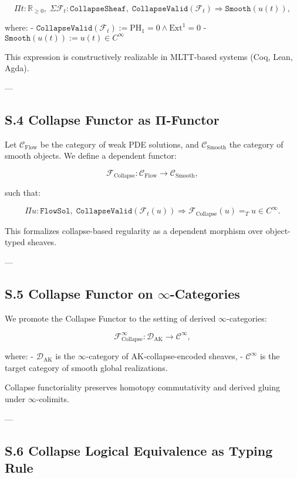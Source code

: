 \documentclass[11pt]{article}
\begin{document}
\[
\Pi t : \mathbb{R}_{\ge 0},\;
\Sigma \mathcal{F}_t : \texttt{CollapseSheaf},\;
\texttt{CollapseValid}(\mathcal{F}_t)
\Rightarrow \texttt{Smooth}(u(t)),
\]

where:
- $\texttt{CollapseValid}(\mathcal{F}_t) := \mathrm{PH}_1 = 0 \wedge \mathrm{Ext}^1 = 0$
- $\texttt{Smooth}(u(t)) := u(t) \in C^\infty$

This expression is constructively realizable in MLTT-based systems (Coq, Lean, Agda).

---

\subsection*{S.4 Collapse Functor as Π-Functor}

Let $\mathcal{C}_{\mathrm{Flow}}$ be the category of weak PDE solutions, and $\mathcal{C}_{\mathrm{Smooth}}$ the category of smooth objects.  
We define a dependent functor:

\[
\mathcal{F}_{\mathrm{Collapse}} : \mathcal{C}_{\mathrm{Flow}} \longrightarrow \mathcal{C}_{\mathrm{Smooth}},
\]

such that:

\[
\Pi u : \texttt{FlowSol},\;
\texttt{CollapseValid}(\mathcal{F}_t(u))
\Rightarrow \mathcal{F}_{\mathrm{Collapse}}(u) =_T u \in C^\infty.
\]

This formalizes collapse-based regularity as a dependent morphism over object-typed sheaves.

---

\subsection*{S.5 Collapse Functor on $\infty$-Categories}

We promote the Collapse Functor to the setting of derived $\infty$-categories:

\[
\mathcal{F}_{\mathrm{Collapse}}^\infty : \mathcal{D}_{\mathrm{AK}} \longrightarrow \mathcal{C}^\infty,
\]

where:
- $\mathcal{D}_{\mathrm{AK}}$ is the $\infty$-category of AK-collapse-encoded sheaves,
- $\mathcal{C}^\infty$ is the target category of smooth global realizations.

Collapse functoriality preserves homotopy commutativity and derived gluing under $\infty$-colimits.

---

\subsection*{S.6 Collapse Logical Equivalence as Typing Rule}
\end{document}

